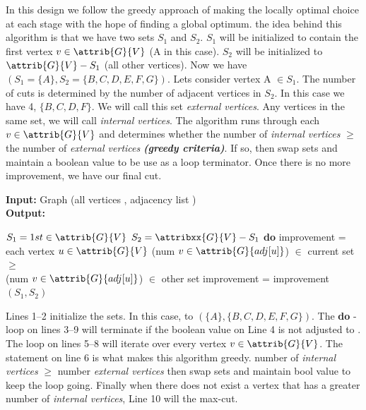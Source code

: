 \begin{homeworkProblem}
\begin{enumerate}[a)]
    In this design we follow the greedy approach of making the locally optimal choice at 
    each stage with the hope of finding a global optimum. the idea behind this algorithm
    is that we have two sets $S_1$ and $S_2$. $S_1$ will be initialized to contain the
    first vertex $v \in \attrib{G}{V}$ (A in this case). $S_2$ will be initialized to 
    $\attrib{G}{V} - S_1$ (all other vertices). Now we have $(S_1 = \{A\}, S_2 = 
    \{B, C, D, E, F, G\})$. Lets consider vertex A $\in S_1$. The number of cuts is
    determined by the number of adjacent vertices in $S_2$. In this case we have 4, 
    $\{B, C, D, F\}$. We will call this set \textit{external vertices}. Any vertices in 
    the same set, we will call \textit{internal vertices}. The algorithm runs through each 
    $v \in \attrib{G}{V}$ and determines whether the number of \textit{internal vertices}
    $\geq$ the number of \textit{external vertices} \textbf{\textit{(greedy criteria)}}. 
    If so, then swap sets and maintain a boolean value to be use as a loop terminator.
    Once there is no more improvement, we have our final cut.\\
    \par 
    \textbf{Input:} Graph (all vertices , adjacency list )
    \\
    \textbf{Output:}   

	\begin{codebox}
    \li $S_1 = 1st \in \attrib{G}{V}$
    \li $S_2 = \attribxx{G}{V} - S_1$
    \li \textbf{do} 
   	\li 	\Do
    		    improvement = 
    \li 	    \For each vertex $u \in \attrib{G}{V}$
    \li             \Do
                        \If (num $v \in \attrib{G}{adj[u]}$) $\in$ current set 
                        $\geq$\\ 
                        \hspace*{1.92cm}(num $v \in \attrib{G}{adj[u]}$) $\in$ 
                        other set
	\li						\Do
    \li                         improvement = 
    						\End
                    \End
            \End 
    \li \While improvement
    \li \Return $(S_1, S_2)$
    \end{codebox}
    
    Lines 1--2 initialize the sets. In this case, to $(\{A\}, \{B, C, D, E, F, G\})$. The
    \textbf{do} - \While loop on lines 3--9 will terminate if the boolean value on Line 4 
    is not adjusted to . The \For loop on lines 5--8 will iterate over every 
    vertex $v \in \attrib{G}{V}$. The \If statement on line 6 is what makes this algorithm 
    greedy. \If number of \textit{internal vertices} $\geq$ number \textit{external 
    vertices} then swap sets and maintain bool value to keep the loop going. Finally when 
    there does not exist a vertex that has a greater number of \textit{internal vertices}, 
    Line 10 will \Return the max-cut. 
    

\end{enumerate}
\end{homeworkProblem}
